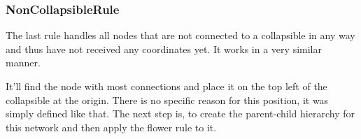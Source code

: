 \subsubsection{NonCollapsibleRule}
The last rule handles all nodes that are not connected to a collapsible in any way and thus have not received any coordinates yet. It works in a very similar manner.

It'll find the node with most connections and place it on the top left of the collapsible at the origin. There is no specific reason for this position, it was simply defined like that. The next step is, to create the parent-child hierarchy for this network and then apply the flower rule to it.

